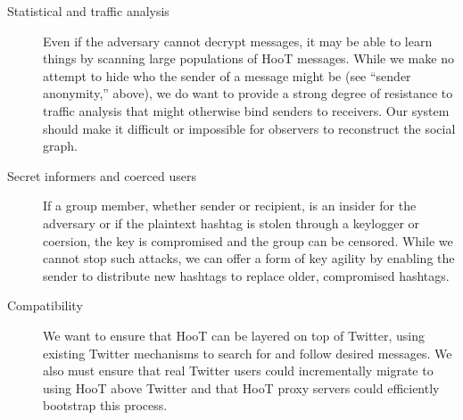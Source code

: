 \begin{description}
\item[Statistical and traffic analysis] Even if the adversary cannot
  decrypt messages, it may be able to learn things by scanning large
  populations of HooT messages. While we make no attempt to hide who the
  sender of a message might be (see ``sender anonymity,'' above), we do
  want to provide a strong degree of resistance to traffic analysis that
  might otherwise bind senders to receivers. Our system should make it
  difficult or impossible for observers to reconstruct the social graph.

\item[Secret informers and coerced users] If a group member, whether
  sender or recipient, is an insider for the adversary or if the
  plaintext hashtag is stolen through a keylogger or coersion, the key
  is compromised and the group can be censored. While we cannot stop
  such attacks, we can offer a form of key agility by enabling the
  sender to distribute new hashtags to replace older, compromised
  hashtags.

\item[Compatibility] We want to ensure that HooT can be layered on top
  of Twitter, using existing Twitter mechanisms to search for and follow
  desired messages. We also must ensure that real Twitter users could
  incrementally migrate to using HooT above Twitter and that HooT proxy
  servers could efficiently bootstrap this process.

\end{description}


